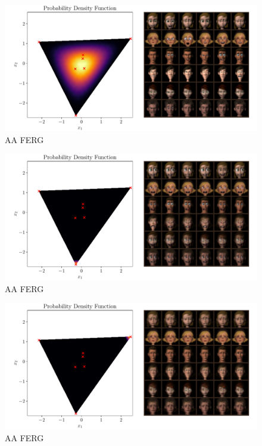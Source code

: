 \begin{figure}[htpb]
    \centering
    \includegraphics[width=1\linewidth]{figures/samples/aa_ferg.pdf}
    \caption{AA FERG}%
    \label{fig:aa_ferg}
\end{figure}

\begin{figure}[htpb]
    \centering
    \includegraphics[width=1\linewidth]{figures/samples/aa_ferg1.pdf}
    \caption{AA FERG}%
    \label{fig:aa_ferg}
\end{figure}

\begin{figure}[htpb]
    \centering
    \includegraphics[width=1\linewidth]{figures/samples/aa_ferg2.pdf}
    \caption{AA FERG}%
    \label{fig:aa_ferg}
\end{figure}

